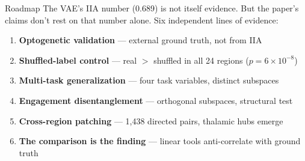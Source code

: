 \documentclass[aspectratio=169,11pt]{beamer}
\begin{document}
\begin{frame}{Roadmap}
\vspace{0.3em}
The VAE's IIA number (0.689) is not itself evidence. But the paper's claims don't rest on that number alone. Six independent lines of evidence:

\vspace{0.5em}
\begin{enumerate}\setlength\itemsep{0.4em}
  \item \textbf{Optogenetic validation} --- external ground truth, not from IIA
  \item \textbf{Shuffled-label control} --- real $>$ shuffled in all 24 regions ($p = 6 \times 10^{-8}$)
  \item \textbf{Multi-task generalization} --- four task variables, distinct subspaces
  \item \textbf{Engagement disentanglement} --- orthogonal subspaces, structural test
  \item \textbf{Cross-region patching} --- 1,438 directed pairs, thalamic hubs emerge
  \item \textbf{The comparison is the finding} --- linear tools anti-correlate with ground truth
\end{enumerate}
\end{frame}
\end{document}
